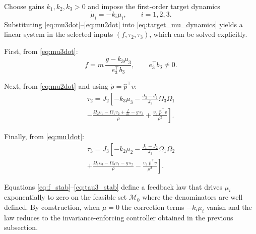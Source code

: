 \documentclass[letterpaper, 10 pt, conference]{ieeeconf}
\begin{document}
Choose gains $k_1,k_2,k_3>0$ and impose the first-order target dynamics
\begin{equation}
\dot \mu_i = -k_i \mu_i, \qquad i=1,2,3.
\label{eq:target_mu_dynamics}
\end{equation}
Substituting \eqref{eq:mu3dot}--\eqref{eq:mu2dot} into \eqref{eq:target_mu_dynamics} yields a linear system in the selected inputs $(f,\tau_2,\tau_3)$, which can be solved explicitly.

First, from \eqref{eq:mu3dot}:
\begin{equation}
f
=
m\,\frac{g-k_3\mu_3}{e_3^\top b_3},
\qquad e_3^\top b_3\neq 0.
\label{eq:f_stab}
\end{equation}

Next, from \eqref{eq:mu2dot} and using $\dot{\rho}=\hat{p}^{\top}v$:
\begin{multline}
    \tau_2
=
J_2\!\left[
-k_3\mu_3
-\frac{J_3-J_1}{J_2}\Omega_3\Omega_1 \right. \\
\left. -\frac{\Omega_2 v_1 - \Omega_1 v_2 + \frac{f}{m} - g\,s_3}{\rho}
+\frac{v_3 \; \hat{p}^{\top}v}{\rho^2}
\right].
\label{eq:tau2_stab}
\end{multline}


Finally, from \eqref{eq:mu1dot}:
\begin{multline}
\tau_3
=
J_3\!\left[
-k_2\mu_2
-\frac{J_1-J_2}{J_3}\Omega_1\Omega_2 \right.
\\ \left. +\frac{\Omega_1 v_3 - \Omega_3 v_1 - g\, s_2}{\rho}
-\frac{v_2 \; \hat{p}^{\top}v}{\rho^2}
\right].
\label{eq:tau3_stab}
\end{multline}


Equations \eqref{eq:f_stab}--\eqref{eq:tau3_stab} define a feedback law that drives \(\mu_i\) exponentially to zero on the feasible set $\mathcal{M}_{0}$ where the denominators are well defined. By construction, when \(\mu=0\) the correction terms \(-k_i\mu_i\) vanish and the law reduces to the invariance-enforcing controller obtained in the previous subsection. 
\end{document}
